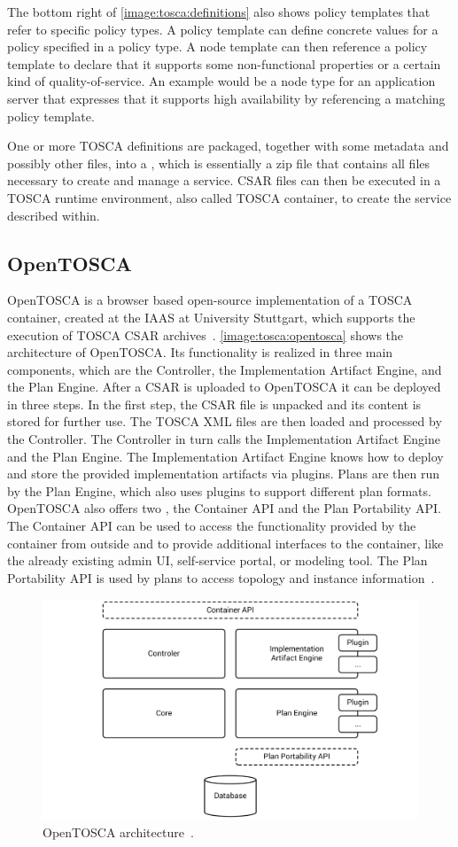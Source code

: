 The bottom right of \autoref{image:tosca:definitions} also shows policy templates that refer to specific policy types.
A policy template can define concrete values for a policy specified in a policy type.
A node template can then reference a policy template to declare that it supports some non-functional properties or a certain kind of quality-of-service.
An example would be a node type for an application server that expresses that it supports high availability by referencing a matching policy template.

One or more TOSCA definitions are packaged, together with some metadata and possibly other files, into a , which is essentially a zip file that contains all files necessary to create and manage a service.
CSAR files can then be executed in a TOSCA runtime environment, also called TOSCA container, to create the service described within.

\subsection{OpenTOSCA}

OpenTOSCA is a browser based open-source implementation of a TOSCA container, created at the IAAS at University Stuttgart, which supports the execution of TOSCA CSAR archives~\autocite{opentosca}.
\autoref{image:tosca:opentosca} shows the architecture of OpenTOSCA.
Its functionality is realized in three main components, which are the Controller, the Implementation Artifact Engine, and the Plan Engine.
After a CSAR is uploaded to OpenTOSCA it can be deployed in three steps.
In the first step, the CSAR file is unpacked and its content is stored for further use.
The TOSCA XML files are then loaded and processed by the Controller.
The Controller in turn calls the Implementation Artifact Engine and the Plan Engine.
The Implementation Artifact Engine knows how to deploy and store the provided implementation artifacts via plugins.
Plans are then run by the Plan Engine, which also uses plugins to support different plan formats.
OpenTOSCA also offers two , the Container API and the Plan Portability API.
The Container API can be used to access the functionality provided by the container from outside and to provide additional interfaces to the container, like the already existing admin UI, self-service portal, or modeling tool.
The Plan Portability API is used by plans to access topology and instance information~\autocite{opentosca}.

\begin{figure}[!htbp]
	\centering
	\includegraphics[resolution=600]{fundamentals/assets/opentosca}
	\caption{OpenTOSCA architecture~\autocite[based on][]{opentosca}.}
	\label{image:tosca:opentosca}
\end{figure}
